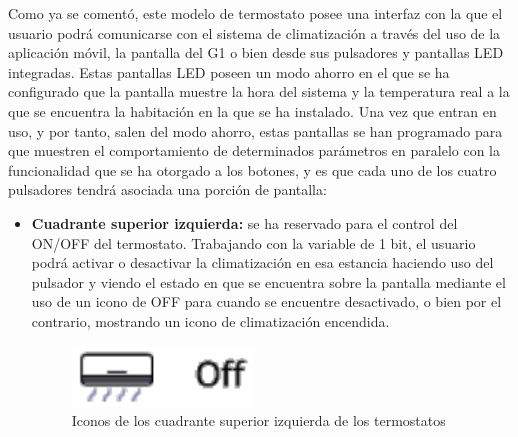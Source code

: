 Como ya se comentó, este modelo de termostato posee una interfaz con la que el usuario podrá comunicarse con el sistema de climatización a través del uso de la aplicación móvil, la pantalla del G1 o bien desde sus pulsadores y pantallas LED integradas. Estas pantallas LED poseen un modo ahorro en el que se ha configurado que la pantalla muestre la hora del sistema y la temperatura real a la que se encuentra la habitación en la que se ha instalado. Una vez que entran en uso, y por tanto, salen del modo ahorro, estas pantallas se han programado para que muestren el comportamiento de determinados parámetros en paralelo con la funcionalidad que se ha otorgado a los botones, y es que cada uno de los cuatro pulsadores tendrá asociada una porción de pantalla: 
\begin{itemize}
\item \textbf{Cuadrante superior izquierda:} se ha reservado para el control del ON/OFF del termostato. Trabajando con la variable de 1 bit, el usuario podrá activar o desactivar la climatización en esa estancia haciendo uso del pulsador y viendo el estado en que se encuentra sobre la pantalla mediante el uso de un icono de OFF para cuando se encuentre desactivado, o bien por el contrario, mostrando un icono de climatización encendida. 
\begin{figure}[H]
\begin{center}
\includegraphics[width=0.45\textwidth]{figures/iconos_term.png}   
\caption{Iconos de los cuadrante superior izquierda de los termostatos}
\label{fig:iconos_term}
\end{center}
\end{figure}


\end{itemize}
